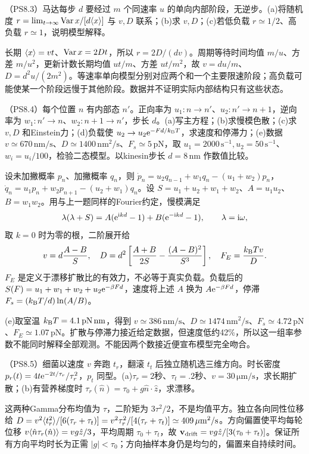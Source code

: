 \begin{exercise}
（PS8.3）马达每步 $d$ 要经过 $m$ 个同速率 $u$ 的单向内部阶段，无逆步。(a)将随机度 $r=\lim_{t\to\infty}\operatorname{Var} x/[d\langle x\rangle]$ 与 $v,D$ 联系；(b)求 $v,D$；(c)若低负载 $r\simeq1/2$、高负载 $r\simeq1$，说明模型解释。
\end{exercise}
\begin{solution}
长期 $\langle x\rangle=vt$、$\operatorname{Var} x=2Dt$，所以 $r=2D/(dv)$。周期等待时间均值 $m/u$、方差 $m/u^2$，更新计数长期均值 $ut/m$、方差 $ut/m^2$，故 $v=du/m$、$D=d^2u/(2m^2)$。等速率单向模型分别对应两个和一个主要限速阶段；高负载可能使某一个阶段远慢于其他阶段。数据并不证明实际内部结构只有这些状态。
\end{solution}

\begin{exercise}
（PS8.4）每个位置 $n$ 有内部态 $n'$。正向率为 $u_1:n\to n'$、$u_2:n'\to n+1$，逆向率为 $w_1:n'\to n$、$w_2:n+1\to n'$，步长 $d$。(a)写主方程；(b)求慢模色散；(c)求 $v,D$ 和Einstein力；(d)负载使 $u_2\to u_2\mathrm e^{-Fd/k_{\mathrm B} T}$，求速度和停滞力；(e)数据 $v\simeq670\,\mathrm{nm/s}$、$D\simeq1400\,\mathrm{nm^2/s}$、$F_s\simeq5\,\mathrm{pN}$，取 $u_1=2000\,\mathrm{s^{-1}},u_2=50\,\mathrm{s^{-1}}$、$w_i=u_i/100$，检验二态模型。以kinesin步长 $d=8\,\mathrm{nm}$ 作数值比较。
\end{exercise}
\begin{solution}
设未加撇概率 $p_n$、加撇概率 $q_n$，则 $\dot p_n=u_2q_{n-1}+w_1q_n-(u_1+w_2)p_n$，$\dot q_n=u_1p_n+w_2p_{n+1}-(u_2+w_1)q_n$。设 $S=u_1+u_2+w_1+w_2$、$A=u_1u_2$、$B=w_1w_2$。用与上一题同样的Fourier约定，慢模满足
\[
\lambda(\lambda+S)=A(\mathrm e^{\mathrm i kd}-1)+B(\mathrm e^{-\mathrm i kd}-1),\qquad \lambda=\mathrm i\omega,
\]
取 $k=0$ 时为零的根，二阶展开给
\[
v=d\frac{A-B}S,\quad D=d^2\left[\frac{A+B}{2S}-\frac{(A-B)^2}{S^3}\right],\quad F_E=\frac{k_{\mathrm B} T v}D.
\]
$F_E$ 是定义于漂移扩散比的有效力，不必等于真实负载。负载后的 $S(F)=u_1+w_1+w_2+u_2\mathrm e^{-\beta Fd}$，速度将上述 $A$ 换为 $A\mathrm e^{-\beta Fd}$，停滞 $F_s=(k_{\mathrm B} T/d)\ln(A/B)$。

(e)取室温 $k_{\mathrm B} T=4.1\,\mathrm{pN\,nm}$，得到 $v\simeq386\,\mathrm{nm/s}$、$D\simeq1474\,\mathrm{nm^2/s}$、$F_s\simeq4.72\,\mathrm{pN}$、$F_E\simeq1.07\,\mathrm{pN}$。扩散与停滞力接近给定数据，但速度低约42\%，所以这一组率参数不能同时解释全部观测。不能因两个数接近便宣布模型完全吻合。
\end{solution}

\begin{exercise}
（PS8.5）细菌以速度 $v$ 奔跑 $t_r$，翻滚 $t_t$ 后独立随机选三维方向。时长密度 $p_r(t)=4t\mathrm e^{-2t/\tau_r}/\tau_r^2$，$p_t$ 同型。(a)$\tau_r=2$秒、$\tau_t=.2$秒、$v=30\,\mathrm{\mu m/s}$，求长期扩散；(b)有营养梯度时 $\tau_r(\hat n)=\tau_0+g\hat n\cdot\hat z$，求漂移。
\end{exercise}
\begin{solution}
这两种Gamma分布均值为 $\tau$，二阶矩为 $3\tau^2/2$，不是均值平方。独立各向同性位移给 $D=v^2\langle t_r^2\rangle/[6(\tau_r+\tau_t)]=v^2\tau_r^2/[4(\tau_r+\tau_t)]\simeq409\,\mathrm{\mu m^2/s}$。方向偏置使平均每轮位移 $v\langle \hat n\tau_r(\hat n)\rangle=vg\hat z/3$，平均周期 $\tau_0+\tau_t$，故 $\mathbf v_{\rm drift}=vg\hat z/[3(\tau_0+\tau_t)]$。保证所有方向平均时长为正需 $|g|<\tau_0$；方向抽样本身仍是均匀的，偏置来自持续时间。
\end{solution}
